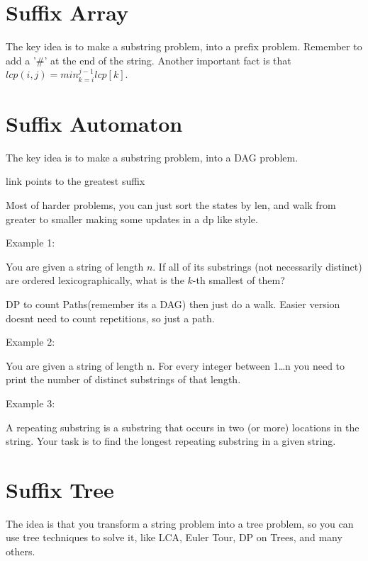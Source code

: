     \section{Suffix Array}
    The key idea is to make a substring problem, into a prefix problem.
    Remember to add a '\#' at the end of the string.
    Another important fact is that $lcp(i,j) = min_{k=i}^{j-1} lcp[k]$.
    
    \section{Suffix Automaton}
    The key idea is to make a substring problem, into a DAG problem.
    
    link points to the greatest suffix
    
    Most of harder problems,  you can just sort the states by len, and walk from greater to smaller
    making some updates in a dp like style.

    
    
    Example 1:

    You are given a string of length $n$. If all of its substrings (not necessarily distinct) are ordered lexicographically, what is the $k$-th smallest of them?

    DP to count Paths(remember its a DAG) then just do a walk. Easier version doesnt need to count repetitions, so just a path.

    
    
    Example 2:
    
    You are given a string of length n. For every integer between 1…n you need to print the number of distinct substrings of that length.

    
    
    
    Example 3:

    A repeating substring is a substring that occurs in two (or more) locations in the string. Your task is to find the longest repeating substring in a given string.
    
    
    
    \section{Suffix Tree} 
    The idea is that you transform a string problem into a tree problem, so you can use tree techniques to solve it, like LCA, Euler Tour, DP on Trees, and many others.
    
